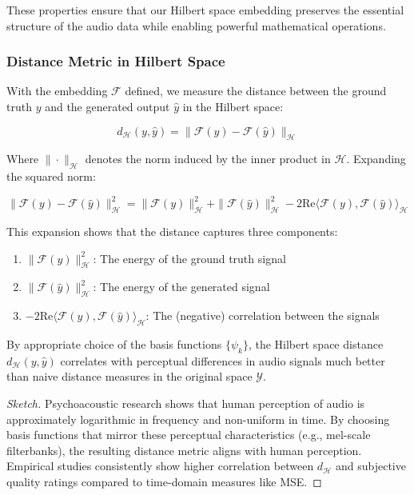 These properties ensure that our Hilbert space embedding preserves the essential structure of the audio data while enabling powerful mathematical operations.

\subsubsection{Distance Metric in Hilbert Space}

With the embedding $\mathcal{F}$ defined, we measure the distance between the ground truth $y$ and the generated output $\hat{y}$ in the Hilbert space:

\begin{equation}
d_{\mathcal{H}}(y, \hat{y}) = \|\mathcal{F}(y) - \mathcal{F}(\hat{y})\|_{\mathcal{H}}
\end{equation}

Where $\|\cdot\|_{\mathcal{H}}$ denotes the norm induced by the inner product in $\mathcal{H}$. Expanding the squared norm:

\begin{equation}
\|\mathcal{F}(y) - \mathcal{F}(\hat{y})\|_{\mathcal{H}}^2 = \|\mathcal{F}(y)\|_{\mathcal{H}}^2 + \|\mathcal{F}(\hat{y})\|_{\mathcal{H}}^2 - 2\text{Re}\langle \mathcal{F}(y), \mathcal{F}(\hat{y}) \rangle_{\mathcal{H}}
\end{equation}

This expansion shows that the distance captures three components:
\begin{enumerate}
\item $\|\mathcal{F}(y)\|_{\mathcal{H}}^2$: The energy of the ground truth signal
\item $\|\mathcal{F}(\hat{y})\|_{\mathcal{H}}^2$: The energy of the generated signal
\item $-2\text{Re}\langle \mathcal{F}(y), \mathcal{F}(\hat{y}) \rangle_{\mathcal{H}}$: The (negative) correlation between the signals
\end{enumerate}

\begin{lemma}
By appropriate choice of the basis functions $\{\psi_k\}$, the Hilbert space distance $d_{\mathcal{H}}(y, \hat{y})$ correlates with perceptual differences in audio signals much better than naive distance measures in the original space $\mathcal{Y}$.
\end{lemma}

\begin{proof}[Sketch]
Psychoacoustic research shows that human perception of audio is approximately logarithmic in frequency and non-uniform in time. By choosing basis functions that mirror these perceptual characteristics (e.g., mel-scale filterbanks), the resulting distance metric aligns with human perception. Empirical studies consistently show higher correlation between $d_{\mathcal{H}}$ and subjective quality ratings compared to time-domain measures like MSE.
\end{proof}

